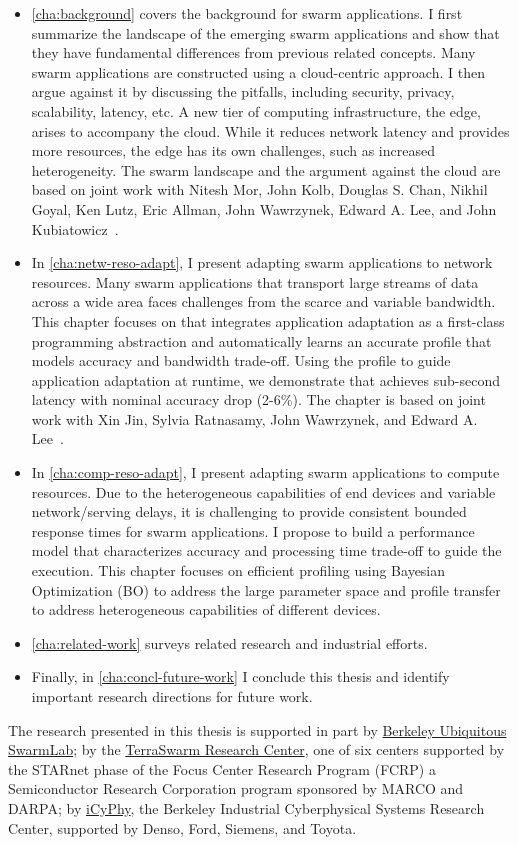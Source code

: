 \documentclass[thesis.tex]{subfiles}
\begin{document}
\begin{itemize}[topsep=5pt, leftmargin=15pt]
\item \autoref{cha:background} covers the background for swarm applications. I
  first summarize the landscape of the emerging swarm applications and show that
  they have fundamental differences from previous related concepts.  Many swarm
  applications are constructed using a cloud-centric approach. I then argue
  against it by discussing the pitfalls, including security, privacy,
  scalability, latency, etc. A new tier of computing infrastructure, the edge,
  arises to accompany the cloud. While it reduces network latency and provides
  more resources, the edge has its own challenges, such as increased
  heterogeneity. The swarm landscape and the argument against the cloud are
  based on joint work with Nitesh Mor, John Kolb, Douglas S. Chan, Nikhil Goyal,
  Ken Lutz, Eric Allman, John Wawrzynek, Edward A. Lee, and John
  Kubiatowicz~\cite{zhang2015cloud}.
\item In \autoref{cha:netw-reso-adapt}, I present adapting swarm applications to
  network resources. Many swarm applications that transport large streams of
  data across a wide area faces challenges from the scarce and variable
  bandwidth. This chapter focuses on \awstream{} that integrates application
  adaptation as a first-class programming abstraction and automatically learns
  an accurate profile that models accuracy and bandwidth trade-off. Using the
  profile to guide application adaptation at runtime, we demonstrate that
  \awstream{} achieves sub-second latency with nominal accuracy drop
  (2-6\%).  The chapter is based on joint work with Xin Jin, Sylvia Ratnasamy,
  John Wawrzynek, and Edward A. Lee~\cite{zhang2018awstream}.
\item In \autoref{cha:comp-reso-adapt}, I present adapting swarm applications to
  compute resources. Due to the heterogeneous capabilities of end devices and
  variable network/serving delays, it is challenging to provide consistent
  bounded response times for swarm applications. I propose to build a
  performance model that characterizes accuracy and processing time trade-off to
  guide the execution. This chapter focuses on efficient profiling using
  Bayesian Optimization (BO) to address the large parameter space and profile
  transfer to address heterogeneous capabilities of different devices.
\item \autoref{cha:related-work} surveys related research and industrial
  efforts.
\item Finally, in \autoref{cha:concl-future-work} I conclude this thesis and
  identify important research directions for future work.
\end{itemize}

The research presented in this thesis is supported in part by
\href{https://swarmlab.berkeley.edu/}{Berkeley Ubiquitous SwarmLab}; by the
\href{https://terraswarm.org/}{TerraSwarm Research Center}, one of six centers
supported by the STARnet phase of the Focus Center Research Program (FCRP) a
Semiconductor Research Corporation program sponsored by MARCO and DARPA; by
\href{https://www.icyphy.org/}{iCyPhy}, the Berkeley Industrial Cyberphysical
Systems Research Center, supported by Denso, Ford, Siemens, and Toyota.
\end{document}
